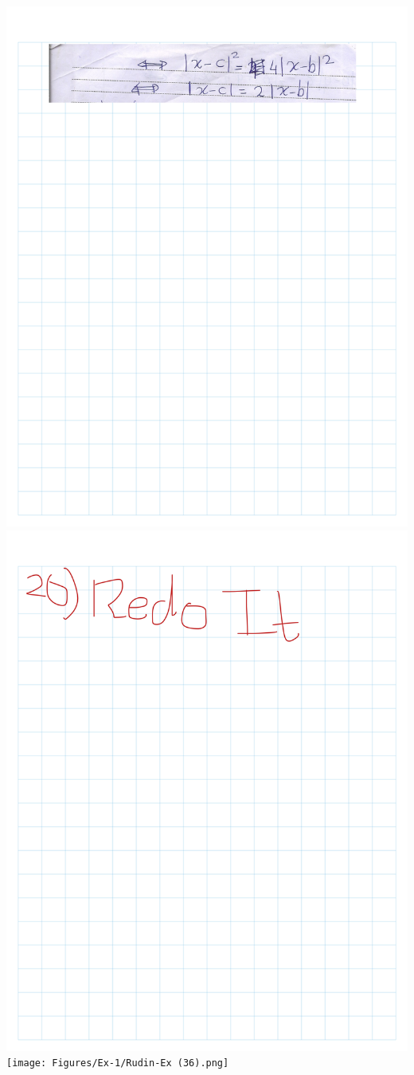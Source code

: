 \documentclass[
]{book}
\theoremstyle{definition}
\theoremstyle{definition}
\theoremstyle{definition}
\theoremstyle{definition}
\theoremstyle{remark}
\begin{document}
\includegraphics{Figures/Ex-1/Rudin-Ex (34).png}
\includegraphics{Figures/Ex-1/Rudin-Ex (35).png}
\texttt{[image: Figures/Ex-1/Rudin-Ex (36).png]}
\end{document}
